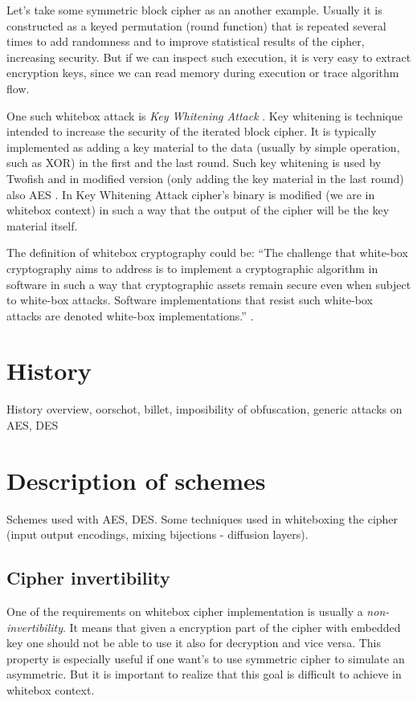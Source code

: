 \documentclass[11pt,oneside,final]{fithesis2}
\begin{document}
    Let's take some symmetric block cipher as an another example. Usually it is constructed as a keyed permutation (round function) that is repeated 
    several times to add randomness and to improve statistical results of the cipher, increasing security. But if we can inspect such execution, it is 
    very easy to extract encryption keys, since we can read memory during execution or trace algorithm flow.
    
    One such whitebox attack is \emph{Key Whitening Attack} \cite{Kerins06acautionary}. Key whitening is technique intended to increase the security of the iterated block cipher.
    It is typically implemented as adding a key material to the data (usually by simple operation, such as XOR) in the first and the last round. Such key whitening 
    is used by Twofish \citep{Schneier98twofish:a} and in modified version (only adding the key material in the last round) also AES \citep{2002-daemen}. In Key Whitening Attack
    cipher's binary is modified (we are in whitebox context) in such a way that the output of the cipher will be the key material itself. 
    
    The definition of whitebox cryptography could be:
    ``The challenge that white-box cryptography aims to address is to implement a cryptographic algorithm in 
    software in such a way that cryptographic assets remain secure even when subject to white-box attacks.
    Software implementations that resist such white-box attacks are denoted white-box implementations.'' \cite{hiding_keys}.
    
    \section{History}
    History overview, oorschot, billet, imposibility of obfuscation, generic attacks on AES, DES

    \section{Description of schemes}
    Schemes used with AES, DES. Some techniques used in whiteboxing the cipher (input output encodings, mixing bijections - diffusion layers).

    \subsection{Cipher invertibility}\label{sec:cipher_invertibility}
    One of the requirements on whitebox cipher implementation is usually a \emph{non-invertibility}. It means that given a encryption part of the cipher 
    with embedded key one should not be able to use it also for decryption and vice versa. This property is especially useful if one want's to use symmetric
    cipher to simulate an asymmetric. But it is important to realize that this goal is difficult to achieve in whitebox context.
    
\end{document}
